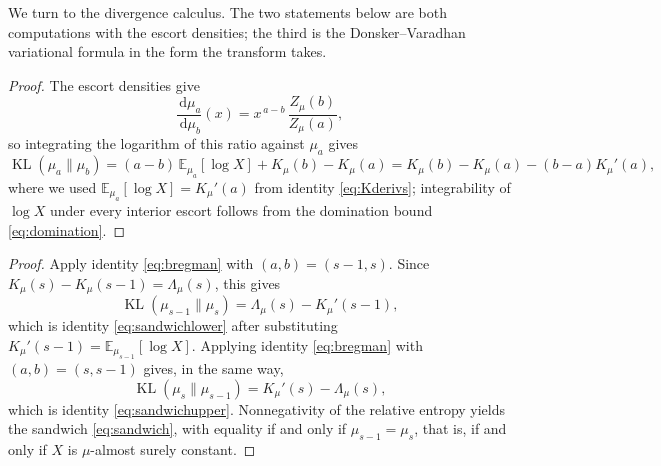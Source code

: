 \documentclass[sn-mathphys-num]{sn-jnl}
\theoremstyle{thmstyleone}%
\theoremstyle{thmstyletwo}%
\theoremstyle{thmstylethree}%
\theoremstyle{thmstyleone}%
\providecommand{\E}{\mathbb{E}}
\providecommand{\KL}{\operatorname{KL}}
\providecommand{\dd}{\,\mathrm{d}}
\begin{document}
\begin{appendices}
		We turn to the divergence calculus. The two statements below are
		both computations with the escort densities; the third is the
		Donsker--Varadhan variational formula in the form the transform
		takes.
		\lembregman*
		
		\begin{proof}
			The escort densities give
			\begin{equation}\label{eq:escortratio}
				\frac{\dd\mu_a}{\dd\mu_b}(x)
				=x^{\,a-b}\,\frac{Z_\mu(b)}{Z_\mu(a)} ,
			\end{equation}
			so integrating the logarithm of this ratio against $\mu_a$ gives
			\begin{equation}\label{eq:bregmanproof}
				\KL(\mu_a\|\mu_b)
				=(a-b)\,\E_{\mu_a}[\log X]+K_\mu(b)-K_\mu(a)
				=K_\mu(b)-K_\mu(a)-(b-a)K_\mu'(a),
			\end{equation}
			where we used $\E_{\mu_a}[\log X]=K_\mu'(a)$ from
			identity \eqref{eq:Kderivs}; integrability of $\log X$ under every interior
			escort follows from the domination bound \eqref{eq:domination}.
		\end{proof}
		
		\thmsandwich*
		
		\begin{proof}
			Apply identity \eqref{eq:bregman} with $(a,b)=(s-1,s)$. Since
			$K_\mu(s)-K_\mu(s-1)=\Lambda_\mu(s)$, this gives
			\begin{equation}\label{eq:remainder1}
				\KL(\mu_{s-1}\|\mu_s)=\Lambda_\mu(s)-K_\mu'(s-1),
			\end{equation}
			which is identity \eqref{eq:sandwichlower} after substituting
			$K_\mu'(s-1)=\E_{\mu_{s-1}}[\log X]$. Applying identity
			\eqref{eq:bregman} with $(a,b)=(s,s-1)$ gives, in the same way,
			\begin{equation}\label{eq:remainder2}
				\KL(\mu_{s}\|\mu_{s-1})=K_\mu'(s)-\Lambda_\mu(s),
			\end{equation}
			which is identity \eqref{eq:sandwichupper}. Nonnegativity of the
			relative entropy yields the sandwich \eqref{eq:sandwich}, with
			equality if and only if $\mu_{s-1}=\mu_s$, that is, if and only if
			$X$ is $\mu$-almost surely constant.
		\end{proof}
		
		\coramgm*
		

\end{appendices}
\end{document}
